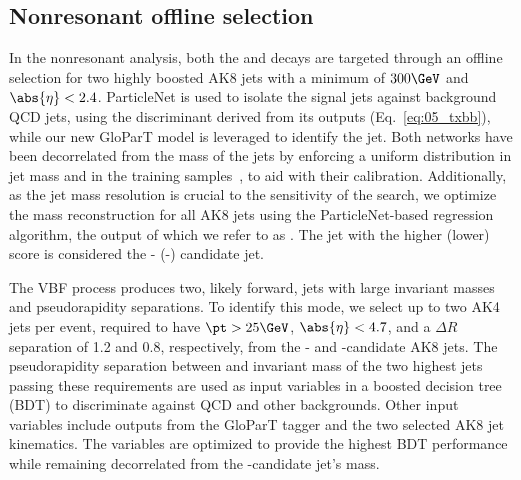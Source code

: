 \subsection{Nonresonant offline selection}
\label{sec:05_selection_nonresonant}

In the nonresonant analysis, both the \hbb and \hvv decays are targeted through an offline selection for two highly boosted AK8 jets with a minimum \pt of $300\GeV$ and $\abs{\eta} < 2.4$.
ParticleNet is used to isolate the signal \hbb jets against background QCD jets, using the \TXbb discriminant derived from its outputs (Eq.~\ref{eq:05_txbb}), while our new GloParT model is leveraged to identify the \hvvq jet.
Both networks have been decorrelated from the mass of the jets by enforcing a uniform distribution in jet mass and \pt in the training samples~\cite{CMS:2023tlv}, to aid with their calibration.
Additionally, as the jet mass resolution is crucial to the sensitivity of the search, we optimize the mass reconstruction for all AK8 jets using the ParticleNet-based regression algorithm, the output of which we refer to as \mreg.
The jet with the higher (lower) \TXbb score is considered the \bbbar- (\VV-) candidate jet.

The VBF process produces two, likely forward, jets with large invariant masses and pseudorapidity separations.
To identify this mode, we select up to two AK4 jets per event, required to have $\pt > 25\GeV$, $\abs{\eta} < 4.7$, and a $\Delta R$ separation of 1.2 and 0.8, respectively, from the \bbbar- and \VV-candidate AK8 jets.
The pseudorapidity separation between and invariant mass of the two highest \pt jets passing these requirements are used as input variables in a boosted decision tree (BDT) to discriminate against QCD and other backgrounds.
Other input variables include outputs from the GloParT tagger and the two selected AK8 jet kinematics.
The variables are optimized to provide the highest BDT performance while remaining decorrelated from the \bbbar-candidate jet's mass.

